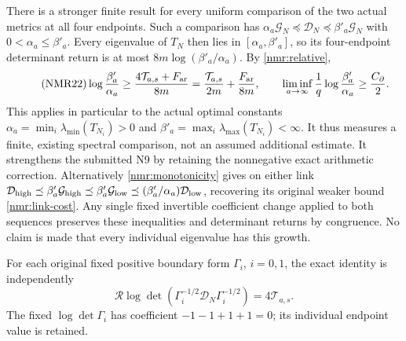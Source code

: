 There is a stronger finite result for every uniform comparison of the
two actual metrics at all four endpoints. Such a comparison has
$\alpha_a\mathcal G_N\preceq\mathcal D_N
\preceq\beta'_a\mathcal G_N$ with $0<\alpha_a\leq\beta'_a$.
Every eigenvalue of $T_N$ then lies in
$[\alpha_a,\beta'_a]$, so its four-endpoint determinant return is at
most $8m\log(\beta'_a/\alpha_a)$. By \eqref{nmr:relative},
\begin{equation}\tag{NMR22}\label{nmr:uniform-cost}
\log\frac{\beta'_a}{\alpha_a}
\geq\frac{4\mathcal T_{a,s}+F_{\rm ar}}{8m}
=\frac{\mathcal T_{a,s}}{2m}+\frac{F_{\rm ar}}{8m},\qquad
\liminf_{a\to\infty}\frac1q\log\frac{\beta'_a}{\alpha_a}
\geq\frac{C_\partial}{2}.
\end{equation}
This applies in particular to the actual optimal constants
$\alpha_a=\min_i\lambda_{\min}(T_{N_i})>0$ and
$\beta'_a=\max_i\lambda_{\max}(T_{N_i})<\infty$.
It thus measures a finite, existing spectral comparison, not an
assumed additional estimate. It strengthens the submitted N9 by
retaining the nonnegative exact arithmetic correction.
Alternatively \eqref{nmr:monotonicity} gives on either link
$\mathcal D_{\rm high}\preceq\beta'_a\mathcal G_{\rm high}
\preceq\beta'_a\mathcal G_{\rm low}
\preceq(\beta'_a/\alpha_a)\mathcal D_{\rm low}$,
recovering its original weaker bound \eqref{nmr:link-cost}.
Any single fixed invertible coefficient change applied to both
sequences preserves these inequalities and determinant returns by
congruence. No claim is made that every individual eigenvalue has
this growth.

For each original fixed positive boundary form $\Gamma_i$, $i=0,1$,
the exact identity is independently
\begin{equation}\tag{NMR23}\label{nmr:fixed-boundary}
\mathcal R\log\det
  (\Gamma_i^{-1/2}\mathcal D_N\Gamma_i^{-1/2})
=4\mathcal T_{a,s}.
\end{equation}
The fixed $\log\det\Gamma_i$ has coefficient
$-1-1+1+1=0$; its individual endpoint value is retained.

